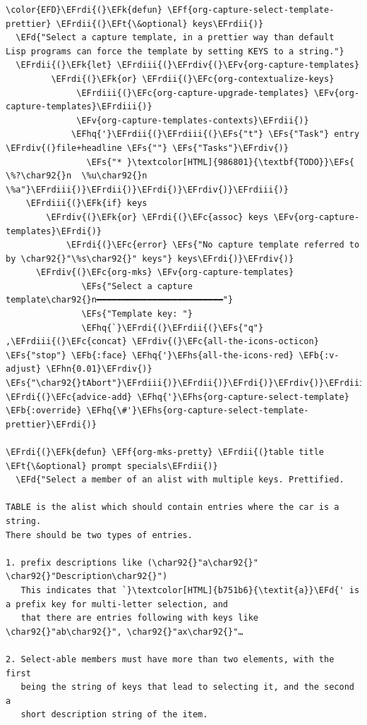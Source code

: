 \documentclass{scrartcl}
\newcommand{\EFk}[1]{\textcolor{EFk}{#1}} %
\newcommand{\EFd}[1]{\textcolor{EFd}{\textit{#1}}} %
\newcommand{\EFt}[1]{\textcolor{EFt}{#1}} %
\newcommand{\EFs}[1]{\textcolor{EFs}{#1}} %
\newcommand{\EFb}[1]{\textcolor{EFb}{#1}} %
\newcommand{\EFc}[1]{\textcolor{EFc}{#1}} %
\newcommand{\EFv}[1]{\textcolor{EFv}{#1}} %
\newcommand{\EFf}[1]{\textcolor{EFf}{#1}} %
\newcommand{\EFhn}[1]{\textcolor{EFhn}{\textbf{#1}}} %
\newcommand{\EFhq}[1]{\textcolor{EFhq}{#1}} %
\newcommand{\EFhs}[1]{\textcolor{EFhs}{#1}} %
\newcommand{\EFrdi}[1]{\textcolor{EFrdi}{#1}} %
\newcommand{\EFrdii}[1]{\textcolor{EFrdii}{#1}} %
\newcommand{\EFrdiii}[1]{\textcolor{EFrdiii}{#1}} %
\newcommand{\EFrdiv}[1]{\textcolor{EFrdiv}{#1}} %
\begin{document}
\begin{Code}
\begin{Verbatim}[]
\color{EFD}\EFrdi{(}\EFk{defun} \EFf{org-capture-select-template-prettier} \EFrdii{(}\EFt{\&optional} keys\EFrdii{)}
  \EFd{"Select a capture template, in a prettier way than default
Lisp programs can force the template by setting KEYS to a string."}
  \EFrdii{(}\EFk{let} \EFrdiii{(}\EFrdiv{(}\EFv{org-capture-templates}
         \EFrdi{(}\EFk{or} \EFrdii{(}\EFc{org-contextualize-keys}
              \EFrdiii{(}\EFc{org-capture-upgrade-templates} \EFv{org-capture-templates}\EFrdiii{)}
              \EFv{org-capture-templates-contexts}\EFrdii{)}
             \EFhq{'}\EFrdii{(}\EFrdiii{(}\EFs{"t"} \EFs{"Task"} entry \EFrdiv{(}file+headline \EFs{""} \EFs{"Tasks"}\EFrdiv{)}
                \EFs{"* }\textcolor[HTML]{986801}{\textbf{TODO}}\EFs{ \%?\char92{}n  \%u\char92{}n  \%a"}\EFrdiii{)}\EFrdii{)}\EFrdi{)}\EFrdiv{)}\EFrdiii{)}
    \EFrdiii{(}\EFk{if} keys
        \EFrdiv{(}\EFk{or} \EFrdi{(}\EFc{assoc} keys \EFv{org-capture-templates}\EFrdi{)}
            \EFrdi{(}\EFc{error} \EFs{"No capture template referred to by \char92{}"\%s\char92{}" keys"} keys\EFrdi{)}\EFrdiv{)}
      \EFrdiv{(}\EFc{org-mks} \EFv{org-capture-templates}
               \EFs{"Select a capture template\char92{}n━━━━━━━━━━━━━━━━━━━━━━━━━"}
               \EFs{"Template key: "}
               \EFhq{`}\EFrdi{(}\EFrdii{(}\EFs{"q"} ,\EFrdiii{(}\EFc{concat} \EFrdiv{(}\EFc{all-the-icons-octicon} \EFs{"stop"} \EFb{:face} \EFhq{'}\EFhs{all-the-icons-red} \EFb{:v-adjust} \EFhn{0.01}\EFrdiv{)} \EFs{"\char92{}tAbort"}\EFrdiii{)}\EFrdii{)}\EFrdi{)}\EFrdiv{)}\EFrdiii{)}\EFrdii{)}\EFrdi{)}
\EFrdi{(}\EFc{advice-add} \EFhq{'}\EFhs{org-capture-select-template} \EFb{:override} \EFhq{\#'}\EFhs{org-capture-select-template-prettier}\EFrdi{)}

\EFrdi{(}\EFk{defun} \EFf{org-mks-pretty} \EFrdii{(}table title \EFt{\&optional} prompt specials\EFrdii{)}
  \EFd{"Select a member of an alist with multiple keys. Prettified.

TABLE is the alist which should contain entries where the car is a string.
There should be two types of entries.

1. prefix descriptions like (\char92{}"a\char92{}" \char92{}"Description\char92{}")
   This indicates that `}\textcolor[HTML]{b751b6}{\textit{a}}\EFd{' is a prefix key for multi-letter selection, and
   that there are entries following with keys like \char92{}"ab\char92{}", \char92{}"ax\char92{}"…

2. Select-able members must have more than two elements, with the first
   being the string of keys that lead to selecting it, and the second a
   short description string of the item.


\end{Verbatim}
\end{Code}
\end{document}
